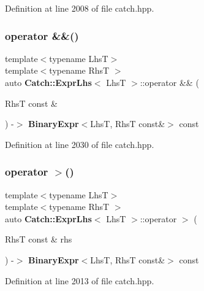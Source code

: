 Definition at line 2008 of file catch.\+hpp.

\mbox{\label{class_catch_1_1_expr_lhs_ab7d8d931db0dcff46fb1d23114c738c0}} 
\subsubsection{operator \&\&()}
{\footnotesize\ttfamily template$<$typename LhsT$>$ \\
template$<$typename RhsT $>$ \\
auto \textbf{ Catch\+::\+Expr\+Lhs}$<$ LhsT $>$\+::operator \&\& (\begin{DoxyParamCaption}\item[{RhsT const \&}]{ }\end{DoxyParamCaption}) -\/$>$ \textbf{ Binary\+Expr}$<$LhsT, RhsT const\&$>$ const \hspace{0.3cm}{\ttfamily [inline]}}



Definition at line 2030 of file catch.\+hpp.

\mbox{\label{class_catch_1_1_expr_lhs_af4f6dc7eeac031cfdc4fd4b78517e5b8}} 
\subsubsection{operator $>$()}
{\footnotesize\ttfamily template$<$typename LhsT$>$ \\
template$<$typename RhsT $>$ \\
auto \textbf{ Catch\+::\+Expr\+Lhs}$<$ LhsT $>$\+::operator $>$ (\begin{DoxyParamCaption}\item[{RhsT const \&}]{rhs }\end{DoxyParamCaption}) -\/$>$ \textbf{ Binary\+Expr}$<$LhsT, RhsT const\&$>$ const \hspace{0.3cm}{\ttfamily [inline]}}



Definition at line 2013 of file catch.\+hpp.

\mbox{\label{class_catch_1_1_expr_lhs_a621240eaaf40e186cd96511c1d29d7b0}} 
